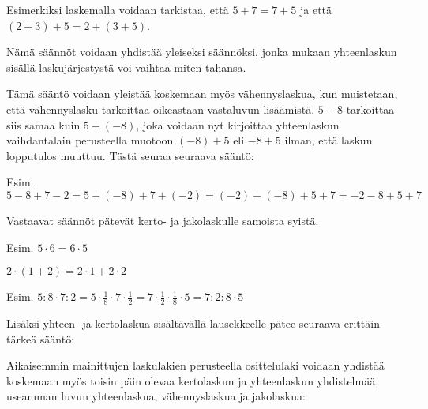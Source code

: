 
Esimerkiksi laskemalla voidaan tarkistaa, että $5+7=7+5$ ja että $(2+3)+5=2+(3+5)$.

Nämä säännöt voidaan yhdistää yleiseksi säännöksi, jonka mukaan yhteenlaskun sisällä laskujärjestystä voi vaihtaa miten tahansa.

Tämä sääntö voidaan yleistää koskemaan myös vähennyslaskua, kun muistetaan, että vähennyslasku tarkoittaa oikeastaan vastaluvun lisäämistä. $5-8$ tarkoittaa siis samaa kuin $5+(-8)$, joka voidaan nyt kirjoittaa yhteenlaskun vaihdantalain perusteella muotoon $(-8)+5$ eli $-8+5$ ilman, että laskun lopputulos muuttuu. Tästä seuraa seuraava sääntö:


Esim. $5-8+7-2=5+(-8)+7+(-2)=(-2)+(-8)+5+7=-2-8+5+7$

Vastaavat säännöt pätevät kerto- ja jakolaskulle samoista syistä.


Esim. $5 \cdot 6 = 6 \cdot 5$

$2 \cdot (1+2) = 2 \cdot 1 + 2 \cdot 2$


Esim. $5:8\cdot 7:2=5\cdot\frac18\cdot 7\cdot\frac12=7\cdot \frac12\cdot\frac18\cdot 5=7:2:8\cdot 5$

Lisäksi yhteen- ja kertolaskua sisältävällä lausekkeelle pätee seuraava erittäin tärkeä sääntö:


Aikaisemmin mainittujen laskulakien perusteella osittelulaki voidaan yhdistää koskemaan myös toisin päin olevaa kertolaskun ja yhteenlaskun yhdistelmää, useamman luvun yhteenlaskua, vähennyslaskua ja jakolaskua:

